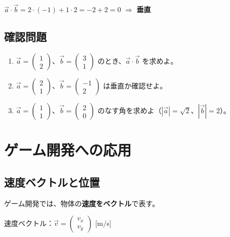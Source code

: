 \documentclass[paper=a4,fleqn]{jlreq}
\begin{document}
\(\vec{a} \cdot \vec{b} = 2 \cdot (-1) + 1 \cdot 2 = -2 + 2 = 0\) \(\Rightarrow\) \textbf{垂直}

\subsection{確認問題}
\begin{enumerate}
  \item \(\vec{a} = \begin{pmatrix} 1 \\ 2 \end{pmatrix}\)、\(\vec{b} = \begin{pmatrix} 3 \\ 1 \end{pmatrix}\) のとき、\(\vec{a} \cdot \vec{b}\) を求めよ。
  \item \(\vec{a} = \begin{pmatrix} 2 \\ 1 \end{pmatrix}\)、\(\vec{b} = \begin{pmatrix} -1 \\ 2 \end{pmatrix}\) は垂直か確認せよ。
  \item \(\vec{a} = \begin{pmatrix} 1 \\ 1 \end{pmatrix}\)、\(\vec{b} = \begin{pmatrix} 2 \\ 0 \end{pmatrix}\) のなす角を求めよ（\(|\vec{a}| = \sqrt{2}\)、\(|\vec{b}| = 2\)）。
\end{enumerate}

\newpage
\section{ゲーム開発への応用}

\subsection{速度ベクトルと位置}

ゲーム開発では、物体の\textbf{速度をベクトル}で表す。

速度ベクトル：\(\vec{v} = \begin{pmatrix} v_x \\ v_y \end{pmatrix}\) [m/s]
\end{document}
